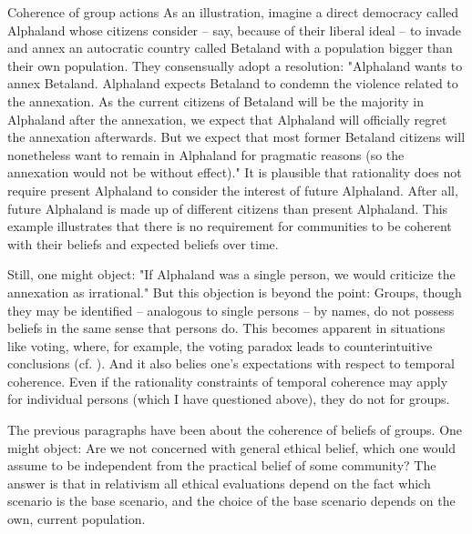 \begin{Example}{Coherence of group actions}{}
As an illustration, imagine a direct democracy called Alphaland whose citizens consider -- say, because of their liberal ideal -- to invade and annex an autocratic country called Betaland with a population bigger than their own population. They consensually adopt a resolution: "Alphaland wants to annex Betaland. Alphaland expects Betaland to condemn the violence related to the annexation. As the current citizens of Betaland will be the majority in Alphaland after the annexation, we expect that Alphaland will officially regret the annexation afterwards. But we expect that most former Betaland citizens will nonetheless want to remain in Alphaland for pragmatic reasons (so the annexation would not be without effect)." It is plausible that rationality does not require present Alphaland to consider the interest of future Alphaland. After all, future Alphaland is made up of different citizens than present Alphaland. This example illustrates that there is no requirement for communities to be coherent with their beliefs and expected beliefs over time. 
\end{Example}

Still, one might object: "If Alphaland was a single person, we would criticize the annexation as irrational." But this objection is beyond the point: Groups, though they may be identified -- analogous to single persons -- by names, do not possess beliefs in the same sense that persons do. This becomes apparent in situations like voting, where, for example,  the voting paradox leads to counterintuitive conclusions (cf. ). And it also belies one's expectations with respect to temporal coherence. Even if the rationality constraints of temporal coherence may apply for individual persons (which I have questioned above), they do not for groups. 

The previous paragraphs have been about the coherence of beliefs of groups. One might object: Are we not concerned with general ethical belief, which one would assume to be independent from the practical belief of some community? The answer is that in relativism all ethical evaluations depend on the fact which scenario is the base scenario, and the choice of the base scenario depends on the own, current population. 

